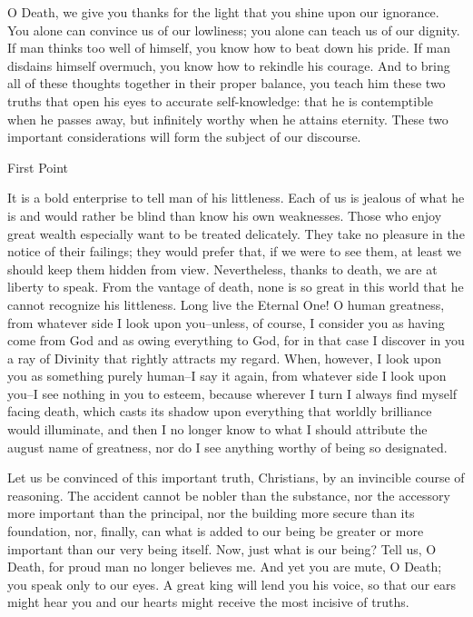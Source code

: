 \documentclass[10pt, twoside]{article}
\newcommand{\pointsection}[1]{%
  \par\vspace{1.5em}%
  {\centering\small #1\par}%
  \vspace{1em}%
}
\begin{document}
O Death, we give you thanks for the light that you shine upon our ignorance. You alone can convince us of our lowliness; you alone can teach us of our dignity. If man thinks too well of himself, you know how to beat down his pride. If man disdains himself overmuch, you know how to rekindle his courage. And to bring all of these thoughts together in their proper balance, you teach him these two truths that open his eyes to accurate self-knowledge: that he is contemptible when he passes away, but infinitely worthy when he attains eternity. These two important considerations will form the subject of our discourse.

\pointsection{First Point}

It is a bold enterprise to tell man of his littleness. Each of us is jealous of what he is and would rather be blind than know his own weaknesses. Those who enjoy great wealth especially want to be treated delicately. They take no pleasure in the notice of their failings; they would prefer that, if we were to see them, at least we should keep them hidden from view. Nevertheless, thanks to death, we are at liberty to speak. From the vantage of death, none is so great in this world that he cannot recognize his littleness. Long live the Eternal One! O human greatness, from whatever side I look upon you--unless, of course, I consider you as having come from God and as owing everything to God, for in that case I discover in you a ray of Divinity that rightly attracts my regard. When, however, I look upon you as something purely human--I say it again, from whatever side I look upon you--I see nothing in you to esteem, because wherever I turn I always find myself facing death, which casts its shadow upon everything that worldly brilliance would illuminate, and then I no longer know to what I should attribute the august name of greatness, nor do I see anything worthy of being so designated.

Let us be convinced of this important truth, Christians, by an invincible course of reasoning. The accident cannot be nobler than the substance, nor the accessory more important than the principal, nor the building more secure than its foundation, nor, finally, can what is added to our being be greater or more important than our very being itself. Now, just what is our being? Tell us, O Death, for proud man no longer believes me. And yet you are mute, O Death; you speak only to our eyes. A great king will lend you his voice, so that our ears might hear you and our hearts might receive the most incisive of truths.
\end{document}
